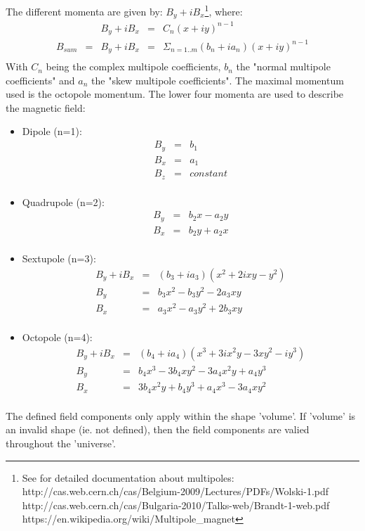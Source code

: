\documentclass[10pt,a4paper]{article}
\begin{document}
The different momenta are given by:  $ B_y + i  B_x $\footnote{
See for detailed documentation about multipoles:\\
http://cas.web.cern.ch/cas/Belgium-2009/Lectures/PDFs/Wolski-1.pdf \\
http://cas.web.cern.ch/cas/Bulgaria-2010/Talks-web/Brandt-1-web.pdf \\
https://en.wikipedia.org/wiki/Multipole\_magnet
}, where:
\begin{align*}
        & & B_y + i B_x &=& C_n (x + iy)^{n-1}                         \\
B_{sum} &=& B_y + i B_x &=& \Sigma_{n=1..m} (b_n + ia_n) (x + iy)^{n-1}\\
\end{align*}
With $C_n$ being the complex multipole coefficients,
$b_n$ the "normal multipole coefficients" and $a_n$ the "skew multipole coefficients".
The maximal momentum used is the octopole momentum. The lower four momenta are used
to describe the magnetic field:
\begin{itemize}\itemcompact
\item Dipole (n=1):
    \begin{align*}
        B_y &=& b_1                                       \\
        B_x &=& a_1                                       \\
        B_z &=& constant                                  \\
    \end{align*}
\item Quadrupole (n=2):
    \begin{align*}
        B_y &=& b_2 x - a_2 y                             \\
        B_x &=& b_2 y + a_2 x                             \\
    \end{align*}
\item Sextupole (n=3):
    \begin{align*}
        B_y + i B_x &=& (b_3 +ia_3) (x^2 + 2ixy - y^2)    \\
        B_y         &=& b_3 x^2 - b_3 y^2 - 2 a_3 xy      \\
        B_x         &=& a_3 x^2 - a_3 y^2 + 2 b_3 xy      \\
    \end{align*}

\item Octopole (n=4):
    \begin{align*}
        B_y + i B_x &=& (b_4 +ia_4) (x^3 + 3ix^2y - 3xy^2 -iy^3)  \\
        B_y &=& b_4 x^3 - 3 b_4 x y^2 - 3 a_4 x^2 y + a_4 y^3     \\
        B_x &=& 3 b_4 x^2 y + b_4 y^3 + a_4 x^3 - 3 a_4 x y^2     \\
    \end{align*}
\end{itemize}
The defined field components only apply within the shape 'volume'.
If 'volume' is an invalid shape (ie. not defined), then the field
components are valied throughout the 'universe'.
\end{document}

